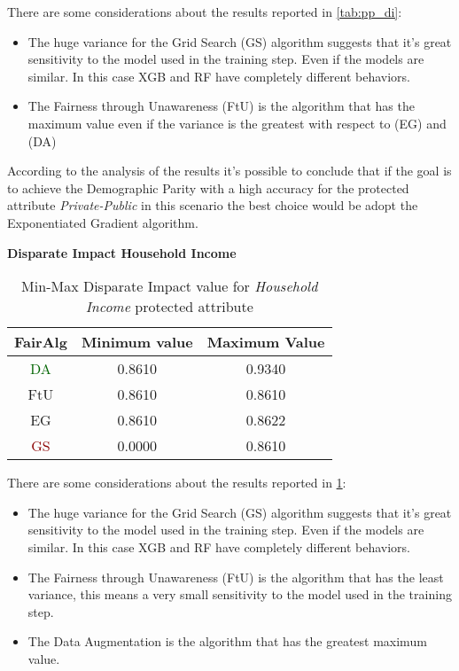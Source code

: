 There are some considerations about the results reported in \cref{tab:pp_di}:

\begin{itemize}

    \item The huge variance for the Grid Search (GS) algorithm suggests that it's great sensitivity to the model used in the training step. Even if the models are similar. In this case XGB and RF have completely different behaviors.

    \item The Fairness through Unawareness (FtU) is the algorithm that has the maximum value even if the variance is the greatest with respect to (EG) and (DA)

\end{itemize}

According to the analysis of the results it's possible to conclude that if the goal is to achieve the Demographic Parity with a high accuracy for the protected attribute \emph{Private-Public} in this scenario the best choice would be adopt the Exponentiated Gradient algorithm.

\textbf{Disparate Impact Household Income}
\begin{table}
    \centering
    \begin{tabular}{|c|c|c|}
        \hline
        \textbf{FairAlg} & \textbf{Minimum value} & \textbf{Maximum Value} \\
        \hline
        \textcolor{darkgreen}{DA} & 0.8610 & 0.9340 \\
        \hline
        FtU & 0.8610 & 0.8610 \\
        \hline
        EG & 0.8610 & 0.8622 \\
        \hline
        \textcolor{darkred}{GS} & 0.0000 & 0.8610 \\
        \hline
    \end{tabular}
    \caption{Min-Max Disparate Impact value for \emph{Household Income} protected attribute}
    \label{tab:h_di}
\end{table}

There are some considerations about the results reported in \cref{tab:h_di}:

\begin{itemize}

    \item The huge variance for the Grid Search (GS) algorithm suggests that it's great sensitivity to the model used in the training step. Even if the models are similar. In this case XGB and RF have completely different behaviors.

    \item The Fairness through Unawareness (FtU) is the algorithm that has the least variance, this means a very small sensitivity to the model used in the training step.

    \item The Data Augmentation is the algorithm that has the greatest maximum value.

\end{itemize}

